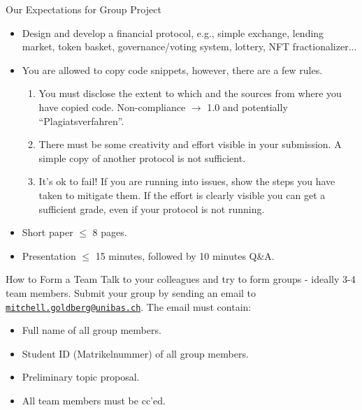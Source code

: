 \documentclass[handout]{beamer}
\begin{document}
\begin{frame}{Our Expectations for Group Project}
	\begin{itemize}
		\item<1-> \color{focus}Design and develop a financial protocol\color{black}, e.g., simple exchange, lending market, token basket, governance/voting system, lottery, NFT fractionalizer...
		\item<2-> You are \color{focus} allowed to copy code \color{black} snippets, however, there are a few rules.
		\begin{enumerate}
			\item<3-> \color{focus} You must disclose \color{black} the \color{focus} extent \color{black} to which and the \color{focus} sources \color{black} from where you have copied code. Non-compliance $\rightarrow$ 1.0 and potentially ``Plagiatsverfahren''. \vspace{0.35em}
			\item<4-> There must be some \color{focus} creativity and effort \color{black} visible in your submission. A simple copy of another protocol is not sufficient.\vspace{0.35em}
			\item<5-> \color{focus} It's ok to fail! \color{black} If you are running into issues, show the steps you have taken to mitigate them. If the effort is clearly visible you can get a sufficient grade, even if your protocol is not running.
		\end{enumerate}
		\item<6-> Short paper $\leq$ 8 pages. 
		\item<7-> Presentation $\leq$ 15 minutes, followed by 10 minutes Q\&A.
	\end{itemize}
\end{frame}

\begin{frame}{How to Form a Team}
\label{TEAM}
	Talk to your colleagues and try to form groups - ideally 3-4 team members. Submit your group by sending an email to \href{mailto:mitchell.goldberg@unibas.ch?subject=Group\%20SCDF}{\texttt{mitchell.goldberg@unibas.ch}}. The email must contain:
	\begin{itemize}
		\item<2-> Full name of all group members.
		\item<3-> Student ID (Matrikelnummer) of all group members.
		\item<4-> Preliminary topic proposal.
		\item<5-> All team members must be cc'ed.
	\end{itemize}

\vspace{1.5em}
\end{frame}
\end{document}
